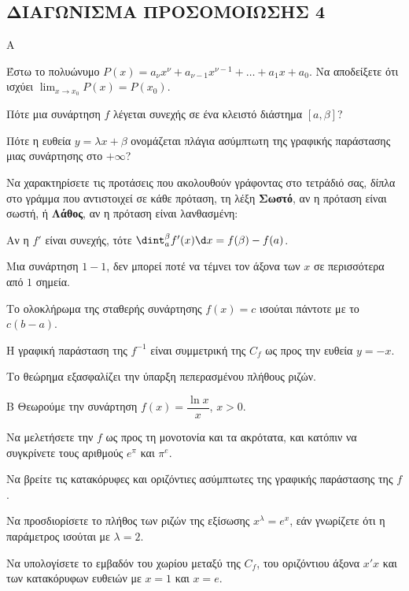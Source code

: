 \subsection{ΔΙΑΓΩΝΙΣΜΑ ΠΡΟΣΟΜΟΙΩΣΗΣ 4}
\begin{thema}{Α}
\begin{erwthma}
    \item Έστω το πολυώνυμο $P(x) = a_\nu x^\nu + a_{\nu-1} x^{\nu-1} + \dots + a_1 x + a_0$. Να αποδείξετε ότι ισχύει $\displaystyle\lim_{x\to x_0} P(x) = P(x_0)$. 
    \item Πότε μια συνάρτηση $f$ λέγεται συνεχής σε ένα κλειστό διάστημα $[a, \beta]$? 
    \item Πότε η ευθεία $y = \lambda x + \beta$ ονομάζεται πλάγια ασύμπτωτη της γραφικής παράστασης μιας συνάρτησης στο $+\infty$? 
    \item Να χαρακτηρίσετε τις προτάσεις που ακολουθούν γράφοντας στο τετράδιό σας, δίπλα στο γράμμα που αντιστοιχεί σε κάθε πρόταση, τη λέξη \textbf{Σωστό},
αν η πρόταση είναι σωστή, ή \textbf{Λάθος}, αν η πρόταση είναι λανθασμένη:
    \begin{alist}
        \item Αν η $f'$ είναι συνεχής, τότε $\dint_a^\beta f'(x) \d x = f(\beta) - f(a)$.
        \item Μια συνάρτηση $1-1$, δεν μπορεί ποτέ να τέμνει τον άξονα των $x$ σε περισσότερα από $1$ σημεία.
        \item Το ολοκλήρωμα της σταθερής συνάρτησης $f(x)=c$ ισούται πάντοτε με το $c (b-a)$.
        \item Η γραφική παράσταση της $f^{-1}$ είναι συμμετρική της $C_f$ ως προς την ευθεία $y=-x$.
        \item Το θεώρημα  εξασφαλίζει την ύπαρξη πεπερασμένου πλήθους ριζών.
    \end{alist} 
\end{erwthma}
\end{thema}

\begin{thema}{Β}
Θεωρούμε την συνάρτηση $f(x) = \dfrac{\ln x}{x}$, $x > 0$.
\begin{erwthma}
    \item Να μελετήσετε την $f$ ως προς τη μονοτονία και τα ακρότατα, και κατόπιν να συγκρίνετε τους αριθμούς $e^\pi$ και $\pi^e$. 
    \item Να βρείτε τις κατακόρυφες και οριζόντιες ασύμπτωτες της γραφικής παράστασης της $f$. 
    \item Να προσδιορίσετε το πλήθος των ριζών της εξίσωσης $x^\lambda = e^x$, εάν γνωρίζετε ότι η παράμετρος ισούται με $\lambda = 2$. 
    \item Να υπολογίσετε το εμβαδόν του χωρίου μεταξύ της $C_f$, του οριζόντιου άξονα $x'x$ και των κατακόρυφων ευθειών με $x=1$ και $x=e$. 
\end{erwthma}
\end{thema}

